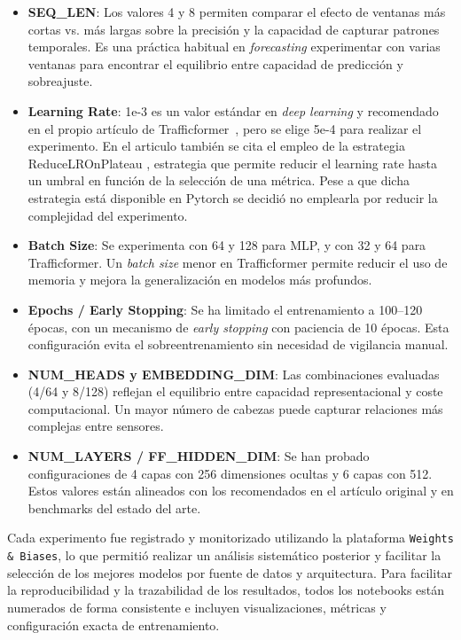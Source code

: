 \begin{itemize}
	\item \textbf{SEQ\_LEN}: Los valores 4 y 8 permiten comparar el efecto de ventanas más cortas vs. más largas sobre la precisión y la capacidad de capturar patrones temporales. Es una práctica habitual en \textit{forecasting} experimentar con varias ventanas para encontrar el equilibrio entre capacidad de predicción y sobreajuste.
	\item \textbf{Learning Rate}: 1e-3 es un valor estándar en \textit{deep learning} y recomendado en el propio artículo de Trafficformer~\cite{transformer_based}, pero se elige 5e-4 para realizar el experimento. En el articulo también se cita el empleo de la estrategia ReduceLROnPlateau \cite{ruder2017overviewgradientdescentoptimization}, estrategia que permite reducir el learning rate hasta un umbral en función de la selección de una métrica. Pese a que dicha estrategia está disponible en Pytorch \cite{pytorchReduceLrOnPLateau} se decidió no emplearla por reducir la complejidad del experimento.
	\item \textbf{Batch Size}: Se experimenta con 64 y 128 para MLP, y con 32 y 64 para Trafficformer. Un \textit{batch size} menor en Trafficformer permite reducir el uso de memoria y mejora la generalización en modelos más profundos.
	\item \textbf{Epochs / Early Stopping}: Se ha limitado el entrenamiento a 100--120 épocas, con un mecanismo de \textit{early stopping} con paciencia de 10 épocas. Esta configuración evita el sobreentrenamiento sin necesidad de vigilancia manual.
	\item \textbf{NUM\_HEADS y EMBEDDING\_DIM}: Las combinaciones evaluadas (4/64 y 8/128) reflejan el equilibrio entre capacidad representacional y coste computacional. Un mayor número de cabezas puede capturar relaciones más complejas entre sensores.
	\item \textbf{NUM\_LAYERS / FF\_HIDDEN\_DIM}: Se han probado configuraciones de 4 capas con 256 dimensiones ocultas y 6 capas con 512. Estos valores están alineados con los recomendados en el artículo original y en benchmarks del estado del arte.
\end{itemize}

Cada experimento fue registrado y monitorizado utilizando la plataforma \texttt{Weights \& Biases}, lo que permitió realizar un análisis sistemático posterior y facilitar la selección de los mejores modelos por fuente de datos y arquitectura. Para facilitar la reproducibilidad y la trazabilidad de los resultados, todos los notebooks están numerados de forma consistente e incluyen visualizaciones, métricas y configuración exacta de entrenamiento.

